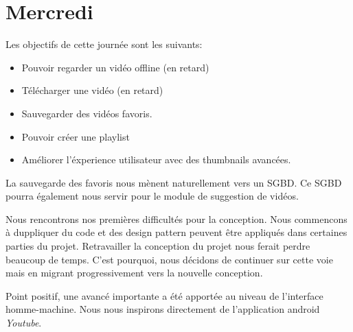 \chapter{Mercredi}


Les objectifs de cette journée sont les suivants:

\begin{itemize}
	\item Pouvoir regarder un vidéo offline (en retard)
	\item Télécharger une vidéo (en retard)
	\item Sauvegarder des vidéos favoris.
	\item Pouvoir créer une playlist
	\item Améliorer l'éxperience utilisateur avec des thumbnails avancées.
\end{itemize}

La sauvegarde des favoris nous mènent naturellement vers un SGBD. Ce SGBD pourra également nous servir pour le module de suggestion de vidéos.

Nous rencontrons nos premières difficultés pour la conception. Nous commencons à duppliquer du code et des design pattern peuvent être appliqués dans certaines parties du projet. Retravailler la conception du projet nous ferait perdre beaucoup de temps. C'est pourquoi, nous décidons de continuer sur cette voie mais en migrant progressivement vers la nouvelle conception.

Point positif, une avancé importante a été apportée au niveau de l'interface homme-machine. Nous nous inspirons directement de l'application android \textit{Youtube}.
